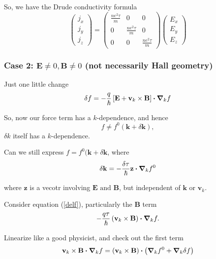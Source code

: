 \documentclass[a4paper]{article}
\newcommand{\hcut}{\hbar}
\begin{document}
So, we have the Drude conductivity formula 
\begin{equation}
	\begin{pmatrix} j_x\\ j_y\\ j_z \end{pmatrix}
	= \begin{pmatrix} 
	\frac{ne^2\tau}{m} & 0 & 0\\
0 & \frac{ne^2\tau}{m} & 0 \\
0 & 0 & \frac{ne^2\tau}{m}\end{pmatrix} 
\begin{pmatrix} E_x\\E_y\\E_z \end{pmatrix} 
\end{equation}

\subsubsection*{Case 2: $ \mathbf{E} \neq  0, \mathbf{B} \neq  0$ (not necessarily Hall geometry)}
Just one little change
\begin{equation}
	\label{delf}
	\delta f = -\frac{q}{\hcut}\left[ \mathbf{E} + \mathbf{v}_k \times \mathbf{B} \right]\vdot \grad_k  f
\end{equation}

So, now our force term has a $k$-dependence, and hence 
\[
	f \neq  f^{0}(\textbf{k} + \delta \mathbf{k})
,\] 
$\delta k$ itself has a $k$-dependence.

Can we still express $f = f^{0}(\textbf{k} + \delta \mathbf{k}$, where
\begin{equation}
	\label{delk}
	\delta \mathbf{k} = -\frac{\delta \tau}{\hcut}\textbf{z} \vdot\grad_k f^{0}
\end{equation}

where $ \mathbf{z}$ is a vecotr involving $ \mathbf{E} \text{ and } \mathbf{B}$,
but independent of $ \mathbf{k}$ or $ \mathbf{v}_k$.

Consider equation (\ref{delf}), particularly the $ \mathbf{B}$ term
\[
-\frac{q\tau}{\hcut}\left( \mathbf{v}_k \times  \mathbf{B} \right) \vdot\grad_k f
.\] 

Linearize like a good physicist, and check out the first term
\begin{equation}
	\mathbf{v}_k \times  \mathbf{B}\vdot\grad_k f
	= \left( \mathbf{v}_k \times  \mathbf{B} \right) \vdot 
	\left( \grad_k f^{0} + \grad_k \delta f\right) 
\end{equation}
\end{document}
